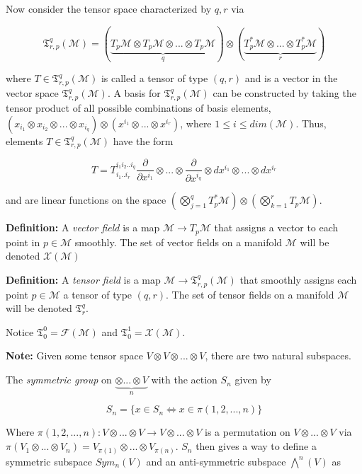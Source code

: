 \documentclass{article}\usepackage[]{graphicx}\usepackage[]{color}
\newcommand{\M}{\mathcal{M}}
\begin{document}
Now consider the tensor space characterized by $q,r$ via

$$
\mathfrak{T}^q_{r,p}(\M )= (\underbrace{ T_p\M\otimes T_p\M\otimes ... \otimes T_p\M }_q)\otimes (
\underbrace{T_p^*\M\otimes ...\otimes T^*_p\M }_r)
$$

where $T\in\mathfrak{T}^q_{r,p}(\M )$ is called a tensor of type $(q,r)$ and is a vector in the vector space $\mathfrak{T}^q_{r,p}(\M )$. A basis for $\mathfrak{T}^q_{r,p}(\M )$ can be constructed by taking the tensor product of all possible combinations of basis elements, $(x_{i_{1}}\otimes x_{i_{2}}\otimes ... \otimes x_{i_{q}})\otimes (x^{i_{1}}\otimes ... \otimes x^{i_{r}})$, where $1\leq i\leq dim(\M )$. Thus, elements $T\in\mathfrak{T}^q_{r,p}(\M )$ have the form 

$$
T=T^{i_1i_2..i_q}_{i_1..i_r}\frac{\partial}{\partial x^{i_1}}\otimes...\otimes\frac{\partial}{\partial x^{i_q}}\otimes dx^{i_1} \otimes ... \otimes dx^{i_r}
$$

and are linear functions on the space $\left(\bigotimes_{j=1}^{q}T^*_p\M \right) \otimes\left(  \bigotimes_{k=1}^{r}T_p\M\right)$.

\textbf{Definition:} A \textit{vector field} is a map $\M\rightarrow T_p\M$ that assigns a vector to each point in $p\in\M$ smoothly. The set of vector fields on a manifold $\M$ will be denoted $\mathcal{X}(\M)$

\textbf{Definition:} A \textit{tensor field} is a map $\M \rightarrow \mathfrak{T}^q_{r,p}(\M )$ that smoothly assigns each point $p\in\M$ a tensor of type $(q,r)$. The set of tensor fields on a manifold $\M$ will be denoted $\mathfrak{T}^q_{r}$.

Notice $\mathfrak{T}^0_0=\mathcal{F}(\M)$ and $\mathfrak{T}^1_0=\mathcal{X}(\M)$.
  

\textbf{Note:} Given some tensor space $V\otimes V\otimes...\otimes V$, there are two natural subspaces.

The \textit{symmetric group} on $\underbrace{\otimes ... \otimes V}_n$ with the action $S_n$ given by 

$$
S_n=\lbrace x\in S_n \iff x\in \pi (1,2,...,n)\rbrace
$$

Where $\pi (1,2,...,n):V\otimes ... \otimes V \rightarrow V\otimes ... \otimes V$ is a permutation on $V\otimes ... \otimes V$ via $\pi (V_1\otimes ... \otimes V_n )=V_{\pi (1)}\otimes ... \otimes V_{\pi (n)}$. $S_n$ then gives a way to define a symmetric subspace $Sym_n(V)$ and an anti-symmetric subspace $\bigwedge^n(V)$ as
\end{document}
